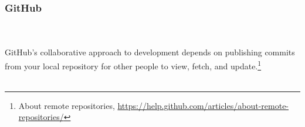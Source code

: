 
\newpage
\subsubsection{GitHub}

\\
\\
\noindent GitHub's collaborative approach to development depends on
publishing commits from your local repository for other people to
view, fetch, and update.\footnote{About remote repositories,
\href{https://help.github.com/articles/about-remote-repositories/}{https://help.github.com/articles/about-remote-repositories/}}
\\
\\

